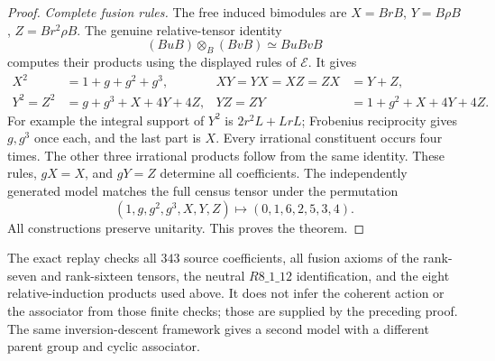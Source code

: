 \begin{proof}
\emph{Complete fusion rules.}
The free induced bimodules are $X=BrB$, $Y=B\rho B$,
$Z=Br^2\rho B$. The genuine relative-tensor identity
\[
 (BuB)\otimes_B(BvB)\simeq BuBvB
\]
computes their products using the displayed rules of $\mathcal E$.
It gives
\begin{align*}
 X^2&=1+g+g^2+g^3,&
 XY=YX=XZ=ZX&=Y+Z,\\
 Y^2=Z^2&=g+g^3+X+4Y+4Z,&
 YZ=ZY&=1+g^2+X+4Y+4Z.
\end{align*}
For example the integral support of $Y^2$ is $2r^2L+LrL$;
Frobenius reciprocity gives $g,g^3$ once each, and the last part is
$X$. Every irrational constituent occurs four times. The other three
irrational products follow from the same identity. These rules,
$gX=X$, and $gY=Z$ determine all coefficients.
The independently generated model matches the full census tensor
under the permutation
\[
 (1,g,g^2,g^3,X,Y,Z)\longmapsto(0,1,6,2,5,3,4).
\]
All constructions preserve unitarity. This proves the theorem.
\end{proof}

The exact replay checks all $343$ source coefficients, all fusion axioms
of the rank-seven and rank-sixteen tensors, the neutral $R8\_1\_12$
identification, and the eight relative-induction products used above.
It does not infer the coherent action or the associator from those
finite checks; those are supplied by the preceding proof.
The same inversion-descent framework gives a second model with a
different parent group and cyclic associator.

